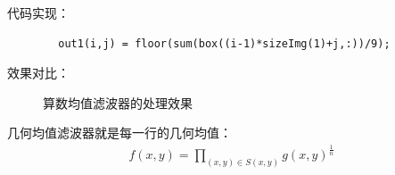 \documentclass{article}
\begin{document}
    代码实现：
    \begin{lstlisting}
        out1(i,j) = floor(sum(box((i-1)*sizeImg(1)+j,:))/9);
    \end{lstlisting}
    效果对比：
    \begin{figure}[]
        \centering
        \caption{算数均值滤波器的处理效果}
    \end{figure}

    几何均值滤波器就是每一行的几何均值：
    \begin{align}
        f(x,y) = {\prod_{(x,y)\in S(x,y)} g(x,y)} ^{\frac{1}{n}}
    \end{align}
    
\end{document}
